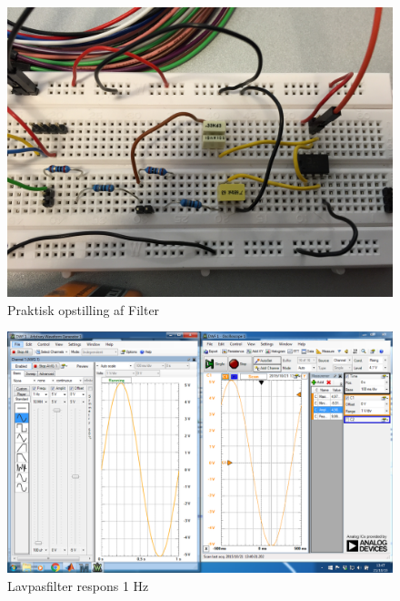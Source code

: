 	

\begin{figure}[H]
	\centering
	\includegraphics[width=1\textwidth]{Figurer/Filterblok}
	\caption{Praktisk opstilling af Filter}
	\label{fig:Filter}
\end{figure}

\begin{figure}[H]
	\centering
	\includegraphics[width=1\textwidth]{Figurer/Lavpasfilter_Praktisk_1Hz}
	\caption{Lavpasfilter respons 1 Hz}
	\label{fig:Filter}
\end{figure}

